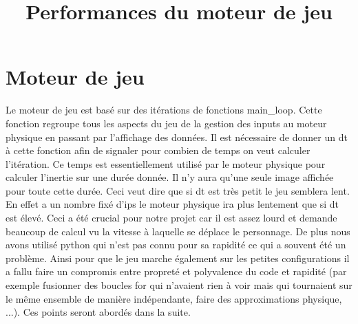 \documentclass[11pt]{article}
\title{\textbf{Performances du moteur de jeu}}
\begin{document}
\maketitle

\section{Moteur de jeu}
Le moteur de jeu est basé sur des itérations de fonctions main\_loop. Cette fonction regroupe tous les aspects du jeu de la gestion des inputs au moteur physique en passant par l'affichage des données. Il est nécessaire de donner un dt à cette fonction afin de signaler pour combien de temps on veut calculer l'itération. Ce temps est essentiellement utilisé par le moteur physique pour calculer l'inertie sur une durée donnée. Il n'y aura qu'une seule image affichée pour toute cette durée. Ceci veut dire que si dt est très petit le jeu semblera lent. En effet a un nombre fixé d'ips le moteur physique ira plus lentement que si dt est élevé. Ceci a été crucial pour notre projet car il est assez lourd et demande beaucoup de calcul vu la vitesse à laquelle se déplace le personnage. De plus nous avons utilisé python qui n'est pas connu pour sa rapidité ce qui a souvent été un problème. Ainsi pour que le jeu marche également sur les petites configurations il a fallu faire un compromis entre propreté et polyvalence du code et rapidité (par exemple fusionner des boucles for qui n'avaient rien à voir mais qui tournaient sur le même ensemble de manière indépendante, faire des approximations physique, ...). Ces points seront abordés dans la suite.
\end{document}
